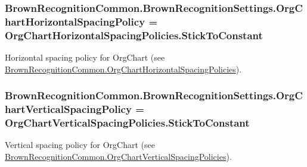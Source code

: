 \hypertarget{class_brown_recognition_common_1_1_brown_recognition_settings_ae7204143c981a3b876b8f448e9d09f68}{
\subsubsection[{\-Org\-Chart\-Horizontal\-Spacing\-Policy}]{ {\bf \-Brown\-Recognition\-Common.\-Brown\-Recognition\-Settings.\-Org\-Chart\-Horizontal\-Spacing\-Policy} = \-Org\-Chart\-Horizontal\-Spacing\-Policies.\-Stick\-To\-Constant}}
\label{class_brown_recognition_common_1_1_brown_recognition_settings_ae7204143c981a3b876b8f448e9d09f68}


\-Horizontal spacing policy for \-Org\-Chart (see \hyperlink{namespace_brown_recognition_common_ac84ab02b07772204f06e83ed86500823}{\-Brown\-Recognition\-Common.\-Org\-Chart\-Horizontal\-Spacing\-Policies}). 

\hypertarget{class_brown_recognition_common_1_1_brown_recognition_settings_a29ff8c34c5e364b7056b2ed2dbfaa168}{
\subsubsection[{\-Org\-Chart\-Vertical\-Spacing\-Policy}]{ {\bf \-Brown\-Recognition\-Common.\-Brown\-Recognition\-Settings.\-Org\-Chart\-Vertical\-Spacing\-Policy} = \-Org\-Chart\-Vertical\-Spacing\-Policies.\-Stick\-To\-Constant}}
\label{class_brown_recognition_common_1_1_brown_recognition_settings_a29ff8c34c5e364b7056b2ed2dbfaa168}


\-Vertical spacing policy for \-Org\-Chart (see \hyperlink{namespace_brown_recognition_common_a1396f230cbda4b33de9ba5d56c9790c7}{\-Brown\-Recognition\-Common.\-Org\-Chart\-Vertical\-Spacing\-Policies}). 

